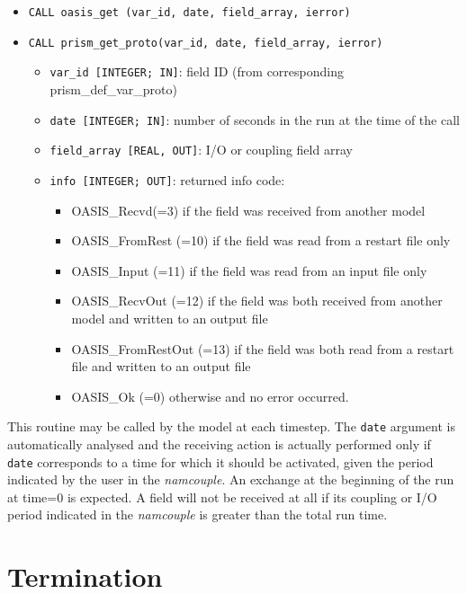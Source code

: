 \begin{itemize}
 
\item {\tt CALL oasis\_get       (var\_id, date, field\_array, ierror)}
\item {\tt CALL prism\_get\_proto(var\_id, date, field\_array, ierror)}
\begin{itemize}
\item {\tt var\_id [INTEGER; IN]}: field ID (from
  corresponding prism\_def\_var\_proto)
\item {\tt date [INTEGER; IN]}: number of seconds in the run at the
time of the call
\item {\tt field\_array [REAL, OUT]}: I/O or coupling field array 
\item {\tt info [INTEGER; OUT]}: returned info code:
   \begin{itemize} 
      \item OASIS\_Recvd(=3) if the field was received from another model
      \item OASIS\_FromRest (=10) if the field was read from a restart
       file only
      \item OASIS\_Input (=11) if the field was read from an input
       file only
      \item OASIS\_RecvOut (=12) if the field was both received from
       another model and written to an output file
      \item OASIS\_FromRestOut (=13) if the field was both read from a
       restart file and written to an output file
      \item OASIS\_Ok (=0) otherwise and no error occurred.
   \end{itemize}
\end{itemize}
\end{itemize}

This routine may be called by the model at each timestep. The {\tt date}
argument is automatically analysed and the receiving action is actually
performed only if {\tt date} corresponds to a time for which it should
be activated, given the period indicated by the user in the
{\it namcouple}. An exchange at the beginning of the run at time=0 is
expected. A field will not be received at all if its
coupling or I/O period indicated in the {\it namcouple} is greater
than the total run time.

\section{Termination}
\label{subsubsec_Termination}

